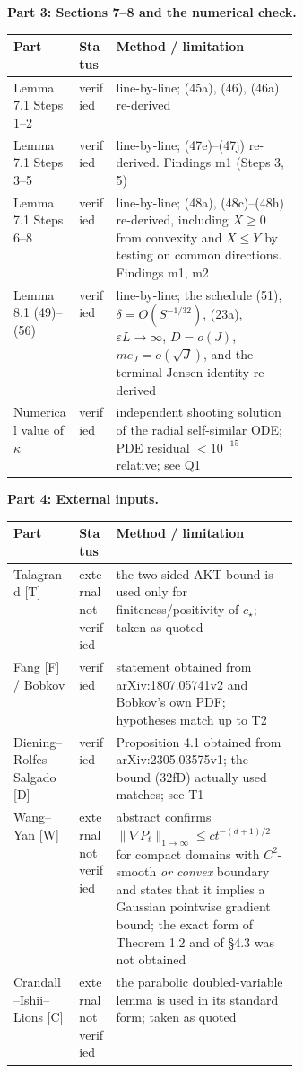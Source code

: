 \documentclass[11pt]{article}
\begin{document}
\medskip\noindent\begin{minipage}{\linewidth}\textbf{Part 3: Sections 7--8 and the numerical check.}\par\nobreak\smallskip\nobreak
\noindent\begin{tabularx}{\linewidth}{@{}>{\raggedright\arraybackslash}p{0.235\linewidth}>{\raggedright\arraybackslash}p{0.135\linewidth}X@{}}
\toprule
Part & Status & Method / limitation \\
\midrule
Lemma 7.1 Steps 1--2 & verified & line-by-line; (45a), (46), (46a) re-derived \\
Lemma 7.1 Steps 3--5 & verified & line-by-line; (47e)--(47j) re-derived. Findings m1 (Steps 3, 5) \\
Lemma 7.1 Steps 6--8 & verified & line-by-line; (48a), (48c)--(48h) re-derived, including $X\ge0$ from convexity and $X\le Y$ by testing on common directions. Findings m1, m2 \\
Lemma 8.1 (49)--(56) & verified & line-by-line; the schedule (51), $\delta=O(S^{-1/32})$, (23a), $\varepsilon L\to\infty$, $D=o(J)$, $me_J=o(\sqrt J)$, and the terminal Jensen identity re-derived \\
Numerical value of $\kappa$ & verified & independent shooting solution of the radial self-similar ODE; PDE residual $<10^{-15}$ relative; see Q1 \\
\bottomrule
\end{tabularx}
\end{minipage}
\medskip\noindent\begin{minipage}{\linewidth}\textbf{Part 4: External inputs.}\par\nobreak\smallskip\nobreak
\noindent\begin{tabularx}{\linewidth}{@{}>{\raggedright\arraybackslash}p{0.235\linewidth}>{\raggedright\arraybackslash}p{0.135\linewidth}X@{}}
\toprule
Part & Status & Method / limitation \\
\midrule
Talagrand [T] & external not verified & the two-sided AKT bound is used only for finiteness/positivity of $c_\star$; taken as quoted \\
Fang [F] / Bobkov & verified & statement obtained from arXiv:1807.05741v2 and Bobkov's own PDF; hypotheses match up to T2 \\
Diening--Rolfes--Salgado [D] & verified & Proposition 4.1 obtained from arXiv:2305.03575v1; the bound (32fD) actually used matches; see T1 \\
Wang--Yan [W] & external not verified & abstract confirms $\|\nabla P_t\|_{1\to\infty}\le ct^{-(d+1)/2}$ for compact domains with $C^2$-smooth \emph{or convex} boundary and states that it implies a Gaussian pointwise gradient bound; the exact form of Theorem 1.2 and of \S4.3 was not obtained \\
Crandall--Ishii--Lions [C] & external not verified & the parabolic doubled-variable lemma is used in its standard form; taken as quoted \\
\bottomrule
\end{tabularx}
\end{minipage}
\end{document}
